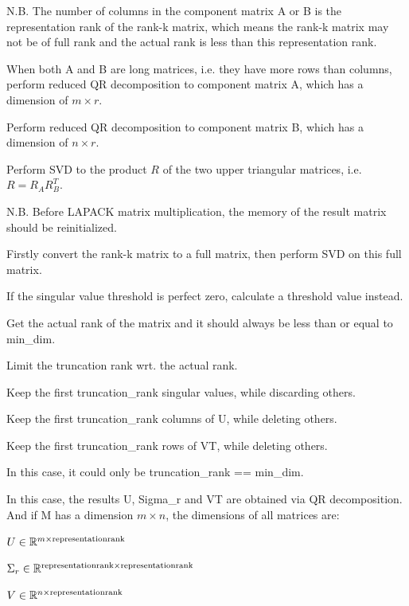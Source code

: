 N.\+B. The number of columns in the component matrix {\ttfamily A} or {\ttfamily B} is the representation rank of the rank-\/k matrix, which means the rank-\/k matrix may not be of full rank and the actual rank is less than this representation rank.

When both {\ttfamily A} and {\ttfamily B} are long matrices, i.\+e. they have more rows than columns, perform reduced QR decomposition to component matrix {\ttfamily A}, which has a dimension of $m \times r$.

Perform reduced QR decomposition to component matrix {\ttfamily B}, which has a dimension of $n \times r$.

Perform S\+VD to the product $R$ of the two upper triangular matrices, i.\+e. $R = R_A R_B^T$.

N.\+B. Before L\+A\+P\+A\+CK matrix multiplication, the memory of the result matrix should be reinitialized.

Firstly convert the rank-\/k matrix to a full matrix, then perform S\+VD on this full matrix.

If the singular value threshold is perfect zero, calculate a threshold value instead.

Get the actual rank of the matrix and it should always be less than or equal to {\ttfamily min\+\_\+dim}.

Limit the truncation rank wrt. the actual rank.

Keep the first {\ttfamily truncation\+\_\+rank} singular values, while discarding others.

Keep the first {\ttfamily truncation\+\_\+rank} columns of {\ttfamily U}, while deleting others.

Keep the first {\ttfamily truncation\+\_\+rank} rows of {\ttfamily VT}, while deleting others.

In this case, it could only be {\ttfamily truncation\+\_\+rank} == {\ttfamily min\+\_\+dim}.

In this case, the results {\ttfamily U}, {\ttfamily Sigma\+\_\+r} and {\ttfamily VT} are obtained via QR decomposition. And if {\ttfamily M} has a dimension $m \times n$, the dimensions of all matrices are\+:
\begin{DoxyItemize}
\item $U \in \mathbb{R}^{m \times {\rm representation rank}}$
\item $\Sigma_r \in \mathbb{R}^{{\rm representation rank} \times {\rm representation rank}}$
\item $V \in \mathbb{R}^{n \times {\rm representation rank}}$
\end{DoxyItemize}

